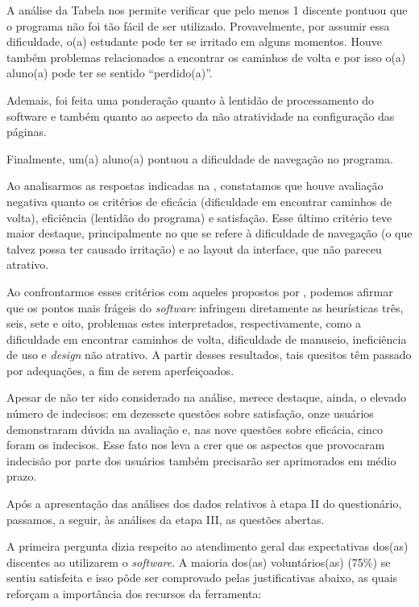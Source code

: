 \documentclass[portuguese]{textolivre}
\begin{document}
A análise da Tabela nos permite verificar que pelo menos 1 discente pontuou que o programa não foi tão fácil de ser utilizado.  Provavelmente, por assumir essa dificuldade, o(a) estudante pode ter se irritado em alguns momentos.
Houve também problemas relacionados a encontrar os caminhos de volta e por isso o(a) aluno(a) pode ter se sentido “perdido(a)”.

Ademais, foi feita uma ponderação quanto à lentidão de processamento do software e   também quanto ao aspecto da não atratividade na configuração das páginas.

Finalmente, um(a) aluno(a) pontuou a dificuldade de navegação no programa.

Ao analisarmos as respostas indicadas na , constatamos que houve avaliação negativa quanto os critérios de eficácia (dificuldade em encontrar caminhos de volta), eficiência (lentidão do programa) e satisfação. Esse último critério teve maior destaque, principalmente no que se refere à dificuldade de navegação (o que talvez possa ter causado irritação) e ao layout da interface, que não pareceu atrativo.

Ao confrontarmos esses critérios com aqueles propostos por \textcite{nielsen1994}, podemos afirmar que os pontos mais frágeis do \textit{software} infringem diretamente as heurísticas três, seis, sete e oito, problemas estes interpretados, respectivamente, como a dificuldade em encontrar caminhos de volta, dificuldade de manuseio, ineficiência de uso e \textit{design} não atrativo. A partir desses resultados, tais quesitos têm passado por adequações, a fim de serem aperfeiçoados.

Apesar de não ter sido considerado na análise, merece destaque, ainda, o elevado número de indecisos: em dezessete questões sobre satisfação, onze usuários demonstraram dúvida na avaliação e, nas nove questões sobre eficácia, cinco foram os indecisos. Esse fato nos leva a crer que os aspectos que provocaram indecisão por parte dos usuários também precisarão ser aprimorados em médio prazo.

Após a apresentação das análises dos dados relativos à etapa II do questionário, passamos, a seguir, às análises da etapa III, as questões abertas.

A primeira pergunta dizia respeito ao atendimento geral das expectativas dos(as) discentes ao utilizarem o \textit{software}. A maioria dos(as) voluntários(as) (75\%) se sentiu satisfeita e isso pôde ser comprovado pelas justificativas abaixo, as quais reforçam a importância dos recursos da ferramenta:
\end{document}
